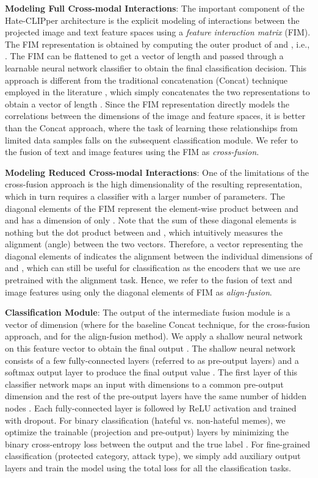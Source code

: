 \documentclass[11pt]{article}
\begin{document}
\noindent \textbf{Modeling Full Cross-modal Interactions}: The important component of the Hate-CLIPper architecture is the explicit modeling of interactions between the projected image and text feature spaces using a \emph{feature interaction matrix} (FIM). The FIM representation  is obtained by computing the outer product of  and , i.e., . The FIM can be flattened to get a vector  of length  and passed through a learnable neural network classifier to obtain the final classification decision. This approach is different from the traditional concatenation (Concat) technique employed in the literature \cite{zia-etal-2021-racist, pramanick2021momenta}, which simply concatenates the two representations to obtain a vector of length . Since the FIM representation directly models the correlations between the dimensions of the image and feature spaces, it is better than the Concat approach, where the task of learning these relationships from limited data samples falls on the subsequent classification module. We refer to the fusion of text and image features using the FIM as \emph{cross-fusion}.

\noindent \textbf{Modeling Reduced Cross-modal Interactions}: One of the limitations of the cross-fusion approach is the high dimensionality of the resulting representation, which in turn requires a classifier with a larger number of parameters. The diagonal elements of the FIM  represent the element-wise product between  and  and has a dimension of only . Note that the sum of these diagonal elements is nothing but the dot product between  and , which intuitively measures the alignment (angle) between the two vectors. Therefore, a vector representing the diagonal elements of  indicates the alignment between the individual dimensions of  and , which can still be useful for classification as the encoders that we use are pretrained with the alignment task. Hence, we refer to the fusion of text and image features using only the diagonal elements of FIM as \emph{align-fusion}.

\noindent \textbf{Classification Module}: The output of the intermediate fusion module is a vector  of dimension  (where  for the baseline Concat technique,  for the cross-fusion approach, and  for the align-fusion method). We apply a shallow neural network on this feature vector  to obtain the final output . The shallow neural network consists of a few fully-connected layers (referred to as pre-output layers) and a softmax output layer to produce the final output value . The first layer of this classifier network maps an input  with  dimensions to a common pre-output dimension  and the rest of the pre-output layers have the same number of hidden nodes . Each fully-connected layer is followed by ReLU activation and trained with dropout. For binary classification (hateful vs. non-hateful memes), we optimize the trainable (projection and pre-output) layers by minimizing the binary cross-entropy loss between the output  and the true label . For fine-grained classification (protected category, attack type), we simply add auxiliary output layers and train the model using the total loss for all the classification tasks. 
\end{document}
